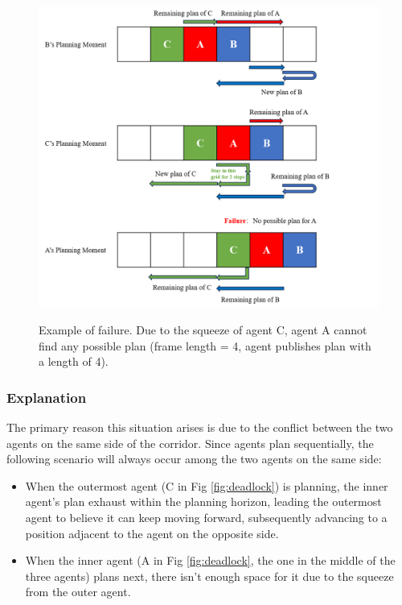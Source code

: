 \begin{figure}[htbp]
    \centering
    \includegraphics[width = \linewidth]{figures/Failure.png}
    \label{fig:failure}
    \caption{Example of failure. Due to the squeeze of agent C, agent A cannot find any possible plan (frame length = 4, agent publishes plan with a length of 4).}
\end{figure}

\subsubsection{Explanation}

The primary reason this situation arises is due to the conflict between the two agents on the same side of the corridor.
Since agents plan sequentially, the following scenario will always occur among the two agents on the same side:
\begin{itemize}
    \item 
    When the outermost agent (C in Fig \ref{fig:deadlock}) is planning, the inner agent's plan exhaust within the planning horizon, leading the outermost agent to believe it can keep moving forward, subsequently advancing to a position adjacent to the agent on the opposite side.
    \item 
    When the inner agent (A in Fig \ref{fig:deadlock}, the one in the middle of the three agents) plans next, there isn't enough space for it due to the squeeze from the outer agent.
\end{itemize}

